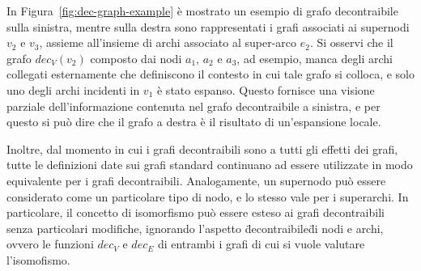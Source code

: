 In Figura~\ref{fig:dec-graph-example} \`e mostrato un esempio di grafo decontraibile sulla sinistra, mentre sulla
destra sono rappresentati i grafi associati ai supernodi $v_2$ e $v_3$, assieme all'insieme di archi associato
al super-arco $e_2$.
Si osservi che il grafo $dec_V(v_2)$ composto dai nodi $a_1$, $a_2$ e $a_3$, ad esempio, manca degli archi collegati
esternamente che definiscono il contesto in cui tale grafo si colloca, e solo uno degli archi incidenti
in $v_1$ \`e stato espanso.
Questo fornisce una visione parziale dell'informazione contenuta nel grafo decontraibile a sinistra,
e per questo si pu\`o dire che il grafo a destra \`e il risultato di un'espansione locale. \newline

Inoltre, dal momento in cui i grafi decontraibili sono a tutti gli effetti dei grafi, tutte le
definizioni date sui grafi standard continuano ad essere utilizzate in modo equivalente per i grafi decontraibili.
Analogamente, un supernodo pu\`o essere considerato come un particolare tipo di nodo, e lo stesso vale per i
superarchi.
In particolare, il concetto di isomorfismo pu\`o essere esteso ai grafi decontraibili senza particolari modifiche,
ignorando l'aspetto \"decontraibile\" di nodi e archi, ovvero le funzioni $dec_V$ e $dec_E$ di entrambi i grafi
di cui si vuole valutare l'isomofismo.




